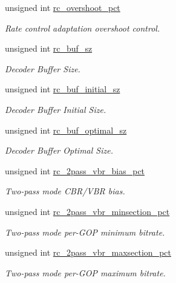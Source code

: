 \begin{DoxyCompactItemize}
unsigned int \hyperlink{structvpx__codec__enc__cfg_a4f2fbd015c1b1f395cc4a4b03d4ead5f}{rc\+\_\+overshoot\+\_\+pct}
\begin{DoxyCompactList}\small\item\em Rate control adaptation overshoot control. \end{DoxyCompactList}\item 
unsigned int \hyperlink{structvpx__codec__enc__cfg_a61866272bb588cd86d28834f420430f0}{rc\+\_\+buf\+\_\+sz}
\begin{DoxyCompactList}\small\item\em Decoder Buffer Size. \end{DoxyCompactList}\item 
unsigned int \hyperlink{structvpx__codec__enc__cfg_aa9e4d6405994ef42d61d478cf6e0d5e0}{rc\+\_\+buf\+\_\+initial\+\_\+sz}
\begin{DoxyCompactList}\small\item\em Decoder Buffer Initial Size. \end{DoxyCompactList}\item 
unsigned int \hyperlink{structvpx__codec__enc__cfg_aafde485867e040a58504ad796e79e47f}{rc\+\_\+buf\+\_\+optimal\+\_\+sz}
\begin{DoxyCompactList}\small\item\em Decoder Buffer Optimal Size. \end{DoxyCompactList}\item 
unsigned int \hyperlink{structvpx__codec__enc__cfg_a21c21ff097890dc3a450731c9b504cf4}{rc\+\_\+2pass\+\_\+vbr\+\_\+bias\+\_\+pct}
\begin{DoxyCompactList}\small\item\em Two-\/pass mode C\+B\+R/\+V\+B\+R bias. \end{DoxyCompactList}\item 
unsigned int \hyperlink{structvpx__codec__enc__cfg_a21eb9fce0844ae07b617bf3f0a25f5a5}{rc\+\_\+2pass\+\_\+vbr\+\_\+minsection\+\_\+pct}
\begin{DoxyCompactList}\small\item\em Two-\/pass mode per-\/\+G\+O\+P minimum bitrate. \end{DoxyCompactList}\item 
unsigned int \hyperlink{structvpx__codec__enc__cfg_ab5212050b71b2d9f4dc663caa496949e}{rc\+\_\+2pass\+\_\+vbr\+\_\+maxsection\+\_\+pct}
\begin{DoxyCompactList}\small\item\em Two-\/pass mode per-\/\+G\+O\+P maximum bitrate. \end{DoxyCompactList}\item 

\end{DoxyCompactItemize}
